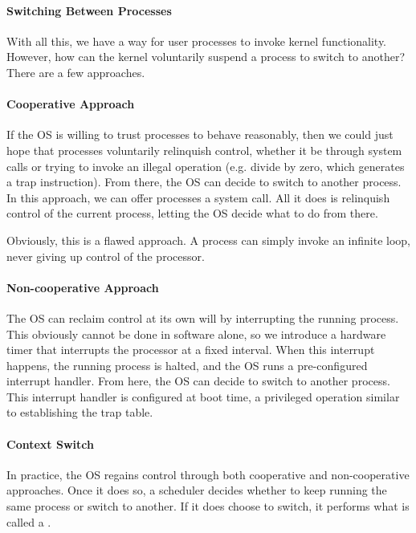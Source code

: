 
\paragraph{Switching Between Processes}
With all this, we have a way for user processes to invoke kernel functionality. However, how can the kernel voluntarily suspend a process to switch to another? There are a few approaches.

\paragraph{Cooperative Approach}
If the OS is willing to trust processes to behave reasonably, then we could just hope that processes voluntarily relinquish control, whether it be through system calls or trying to invoke an illegal operation (e.g. divide by zero, which generates a trap instruction). From there, the OS can decide to switch to another process. In this approach, we can offer processes a  system call. All it does is relinquish control of the current process, letting the OS decide what to do from there.

Obviously, this is a flawed approach. A process can simply invoke an infinite loop, never giving up control of the processor.

\paragraph{Non-cooperative Approach}
The OS can reclaim control at its own will by interrupting the running process. This obviously cannot be done in software alone, so we introduce a hardware timer that interrupts the processor at a fixed interval. When this interrupt happens, the running process is halted, and the OS runs a pre-configured interrupt handler. From here, the OS can decide to switch to another process. This interrupt handler is configured at boot time, a privileged operation similar to establishing the trap table.

\paragraph{Context Switch}
In practice, the OS regains control through both cooperative and non-cooperative approaches. Once it does so, a scheduler decides whether to keep running the same process or switch to another. If it does choose to switch, it performs what is called a .

